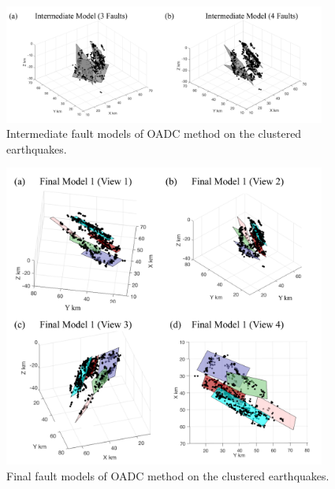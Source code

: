 \documentclass[draft]{agujournal2018}
\begin{document}
\begin{figure}[ht]
\centering
\includegraphics[width=25pc]{Figures/OADC_fig_2.png}
\caption{Intermediate fault models of OADC method on the clustered earthquakes.}
\label{figsix}
\end{figure}


\begin{figure}[ht]
\centering
\includegraphics[width=25pc]{Figures/OADC_fig_final1.png}
\caption{Final fault models of OADC method on the clustered earthquakes.}
\label{figsix}
\end{figure}
\end{document}
